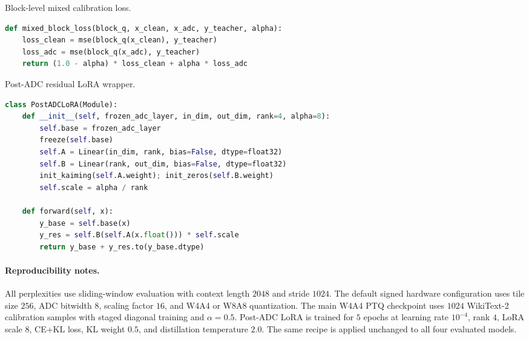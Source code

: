 \documentclass[letterpaper]{article} %
\theoremstyle{plain}
\begin{document}
\begin{listing}[tb]
\caption{Block-level mixed calibration loss.}
\label{lst:mixed_loss}
\begin{lstlisting}[language=Python]
def mixed_block_loss(block_q, x_clean, x_adc, y_teacher, alpha):
    loss_clean = mse(block_q(x_clean), y_teacher)
    loss_adc = mse(block_q(x_adc), y_teacher)
    return (1.0 - alpha) * loss_clean + alpha * loss_adc
\end{lstlisting}
\end{listing}

\begin{listing}[tb]
\caption{Post-ADC residual LoRA wrapper.}
\label{lst:lora}
\begin{lstlisting}[language=Python]
class PostADCLoRA(Module):
    def __init__(self, frozen_adc_layer, in_dim, out_dim, rank=4, alpha=8):
        self.base = frozen_adc_layer
        freeze(self.base)
        self.A = Linear(in_dim, rank, bias=False, dtype=float32)
        self.B = Linear(rank, out_dim, bias=False, dtype=float32)
        init_kaiming(self.A.weight); init_zeros(self.B.weight)
        self.scale = alpha / rank

    def forward(self, x):
        y_base = self.base(x)
        y_res = self.B(self.A(x.float())) * self.scale
        return y_base + y_res.to(y_base.dtype)
\end{lstlisting}
\end{listing}

\paragraph{Reproducibility notes.}
All perplexities use sliding-window evaluation with context length $2048$ and stride $1024$. The default signed hardware configuration uses tile size $256$, ADC bitwidth $8$, scaling factor $16$, and W4A4 or W8A8 quantization. The main W4A4 PTQ checkpoint uses $1024$ WikiText-2 calibration samples with staged diagonal training and $\alpha = 0.5$. Post-ADC LoRA is trained for $5$ epochs at learning rate $10^{-4}$, rank $4$, LoRA scale $8$, CE+KL loss, KL weight $0.5$, and distillation temperature $2.0$. The same recipe is applied unchanged to all four evaluated models.


\end{document}
